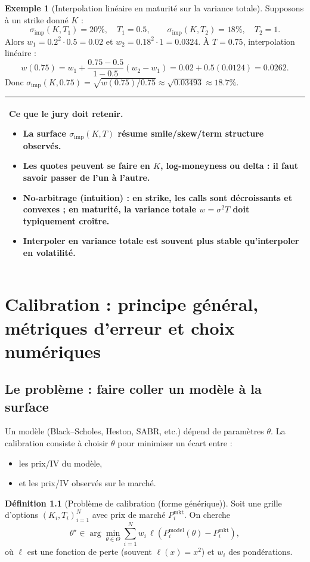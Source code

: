 \documentclass[11pt,a4paper]{report}
\newcommand{\1}{\mathbbm{1}}
\theoremstyle{definition}
\newtheorem{definition}{Définition}[chapter]
\newtheorem{example}{Exemple}[chapter]
\theoremstyle{plain}
\theoremstyle{remark}
\newenvironment{jurybox}{%
  \begin{center}
  \setlength{\tabcolsep}{6pt}%
  \renewcommand{\arraystretch}{1.1}%
  \begin{tabular}{|p{0.94\textwidth}|}
  \hline
  \small\textbf{Ce que le jury doit retenir.}\par\medskip
}{%
  \\ \hline
  \end{tabular}
  \end{center}
}
\begin{document}
\begin{example}[Interpolation linéaire en maturité sur la variance totale]
Supposons à un strike donné $K$ :
\[
\sigma_{\mathrm{imp}}(K,T_1)=20\%,\quad T_1=0.5,\qquad
\sigma_{\mathrm{imp}}(K,T_2)=18\%,\quad T_2=1.
\]
Alors $w_1=0.2^2\cdot 0.5=0.02$ et $w_2=0.18^2\cdot 1=0.0324$.
À $T=0.75$, interpolation linéaire :
\[
w(0.75)=w_1 + \frac{0.75-0.5}{1-0.5}(w_2-w_1)=0.02+0.5(0.0124)=0.0262.
\]
Donc $\sigma_{\mathrm{imp}}(K,0.75)=\sqrt{w(0.75)/0.75}\approx \sqrt{0.03493}\approx 18.7\%$.
\end{example}

\begin{jurybox}
\begin{itemize}
\item La surface $\sigma_{\mathrm{imp}}(K,T)$ résume smile/skew/term structure observés.
\item Les quotes peuvent se faire en $K$, log-moneyness ou delta : il faut savoir passer de l'un à l'autre.
\item No-arbitrage (intuition) : en strike, les calls sont décroissants et convexes ; en maturité, la variance totale $w=\sigma^2 T$ doit typiquement croître.
\item Interpoler en variance totale est souvent plus stable qu'interpoler en volatilité.
\end{itemize}
\end{jurybox}

\chapter{Calibration : principe général, métriques d'erreur et choix numériques}
\label{chap:calibration}

\section{Le problème : faire coller un modèle à la surface}
Un modèle (Black--Scholes, Heston, SABR, etc.) dépend de paramètres $\theta$.
La calibration consiste à choisir $\theta$ pour minimiser un écart entre :
\begin{itemize}
  \item les prix/IV du modèle,
  \item et les prix/IV observés sur le marché.
\end{itemize}

\begin{definition}[Problème de calibration (forme générique)]
Soit une grille d'options $(K_i,T_i)_{i=1}^N$ avec prix de marché $P_i^{\mathrm{mkt}}$.
On cherche
\[
\theta^\star \in \arg\min_{\theta\in\Theta} \sum_{i=1}^N w_i\,\ell\!\left(P_i^{\mathrm{model}}(\theta)-P_i^{\mathrm{mkt}}\right),
\]
où $\ell$ est une fonction de perte (souvent $\ell(x)=x^2$) et $w_i$ des pondérations.
\end{definition}
\end{document}
